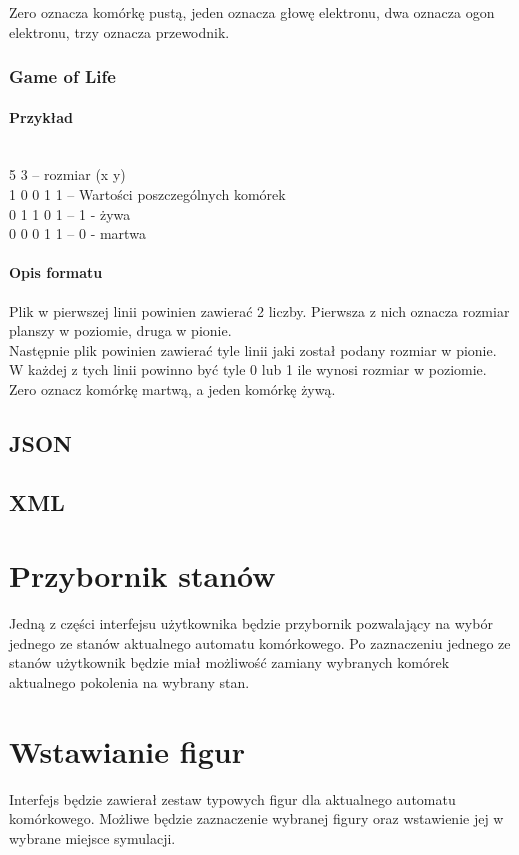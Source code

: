 \documentclass{report}
\begin{document}
Zero oznacza komórkę pustą, jeden oznacza głowę elektronu, dwa oznacza ogon elektronu, trzy oznacza przewodnik.

\subsubsection{Game of Life}

\paragraph{Przykład} \mbox{} \\
5 3 \tab -- rozmiar (x y) \\
1 0 0 1 1 \tab -- Wartości poszczególnych komórek \\
0 1 1 0 1 \tab -- 1 - żywa \\
0 0 0 1 1 \tab -- 0 - martwa \\

\paragraph{Opis formatu}
Plik w pierwszej linii powinien zawierać 2 liczby. Pierwsza z nich oznacza rozmiar planszy w poziomie, druga w pionie. \\
Następnie plik powinien zawierać tyle linii jaki został podany rozmiar w pionie. W każdej z tych linii powinno być tyle 0 lub 1 ile wynosi rozmiar w poziomie. \\
Zero oznacz komórkę martwą, a jeden komórkę żywą.

\subsection{JSON}

\subsection{XML}

\section{Przybornik stanów}
Jedną z części interfejsu użytkownika będzie przybornik pozwalający na wybór jednego ze stanów aktualnego automatu komórkowego. Po zaznaczeniu jednego ze stanów użytkownik będzie miał możliwość zamiany wybranych komórek aktualnego pokolenia na wybrany stan.

\section{Wstawianie figur}
Interfejs będzie zawierał zestaw typowych figur dla aktualnego automatu komórkowego. Możliwe będzie zaznaczenie wybranej figury oraz wstawienie jej w wybrane miejsce symulacji.
\end{document}
